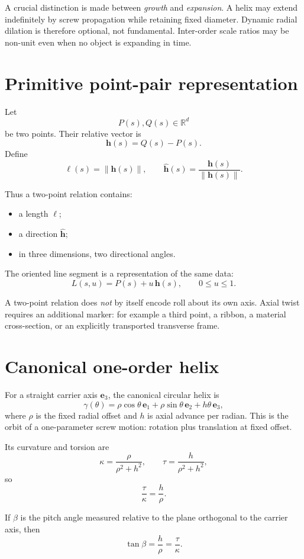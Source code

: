 \documentclass[11pt]{article}
\newcommand{\R}{\mathbb{R}}
\begin{document}
A crucial distinction is made between \emph{growth} and \emph{expansion}.
A helix may extend indefinitely by screw propagation while retaining fixed
diameter.  Dynamic radial dilation is therefore optional, not fundamental.
Inter-order scale ratios may be non-unit even when no object is expanding in
time.

\section{Primitive point-pair representation}

Let
\[
P(s),Q(s)\in\R^d
\]
be two points.  Their relative vector is
\[
\mathbf{h}(s)=Q(s)-P(s).
\]
Define
\[
\ell(s)=\|\mathbf{h}(s)\|,
\qquad
\widehat{\mathbf{h}}(s)=\frac{\mathbf{h}(s)}{\|\mathbf{h}(s)\|}.
\]

Thus a two-point relation contains:
\begin{itemize}
    \item a length $\ell$;
    \item a direction $\widehat{\mathbf h}$;
    \item in three dimensions, two directional angles.
\end{itemize}

The oriented line segment is a representation of the same data:
\[
L(s,u)=P(s)+u\,\mathbf h(s),
\qquad 0\le u\le1.
\]

A two-point relation does \emph{not} by itself encode roll about its own axis.
Axial twist requires an additional marker: for example a third point, a ribbon,
a material cross-section, or an explicitly transported transverse frame.

\section{Canonical one-order helix}

For a straight carrier axis $\mathbf e_3$, the canonical circular helix is
\[
\gamma(\theta)
=
\rho\cos\theta\,\mathbf e_1
+
\rho\sin\theta\,\mathbf e_2
+
h\theta\,\mathbf e_3,
\]
where $\rho$ is the fixed radial offset and $h$ is axial advance per radian.
This is the orbit of a one-parameter screw motion: rotation plus translation at
fixed offset.

Its curvature and torsion are
\[
\kappa=\frac{\rho}{\rho^2+h^2},
\qquad
\tau=\frac{h}{\rho^2+h^2},
\]
so
\[
\frac{\tau}{\kappa}=\frac{h}{\rho}.
\]

If $\beta$ is the pitch angle measured relative to the plane orthogonal to the
carrier axis, then
\[
\tan\beta=\frac{h}{\rho}
=\frac{\tau}{\kappa}.
\]
\end{document}
